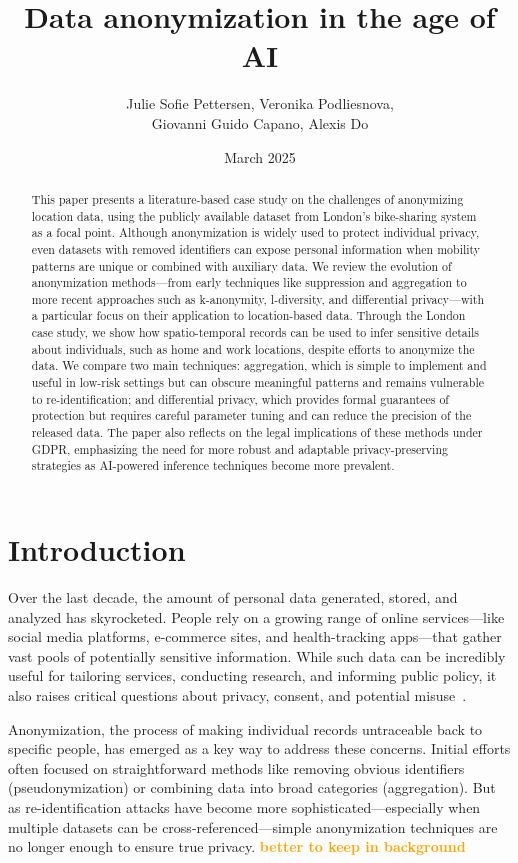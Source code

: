 \documentclass[twocolumn]{article}
\title{\textbf{Data anonymization in the age of AI}}
\author{Julie Sofie Pettersen, Veronika Podliesnova,\\ Giovanni Guido Capano, Alexis Do}
\date{March 2025}
\newcommand{\later}[1]{\textbf{\textcolor{orange}{#1}}}
\begin{document}
\maketitle

\begin{abstract}
This paper presents a literature-based case study on the challenges of anonymizing location data, using the publicly available dataset from London's bike-sharing system as a focal point. Although anonymization is widely used to protect individual privacy, even datasets with removed identifiers can expose personal information when mobility patterns are unique or combined with auxiliary data. We review the evolution of anonymization methods—from early techniques like suppression and aggregation to more recent approaches such as k-anonymity, l-diversity, and differential privacy—with a particular focus on their application to location-based data. Through the London case study, we show how spatio-temporal records can be used to infer sensitive details about individuals, such as home and work locations, despite efforts to anonymize the data. We compare two main techniques: aggregation, which is simple to implement and useful in low-risk settings but can obscure meaningful patterns and remains vulnerable to re-identification; and differential privacy, which provides formal guarantees of protection but requires careful parameter tuning and can reduce the precision of the released data. The paper also reflects on the legal implications of these methods under GDPR, emphasizing the need for more robust and adaptable privacy-preserving strategies as AI-powered inference techniques become more prevalent.
\end{abstract}


\section{Introduction}

Over the last decade, the amount of personal data generated, stored, and analyzed has skyrocketed. People rely on a growing range of online services—like social media platforms, e-commerce sites, and health-tracking apps—that gather vast pools of potentially sensitive information. While such data can be incredibly useful for tailoring services, conducting research, and informing public policy, it also raises critical questions about privacy, consent, and potential misuse~\cite{montjoye2013unique}.

Anonymization, the process of making individual records untraceable back to specific people, has emerged as a key way to address these concerns. Initial efforts often focused on straightforward methods like removing obvious identifiers (pseudonymization) or combining data into broad categories (aggregation). But as re-identification attacks have become more sophisticated—especially when multiple datasets can be cross-referenced—simple anonymization techniques are no longer enough to ensure true privacy. \later{better to keep in background}
\end{document}
